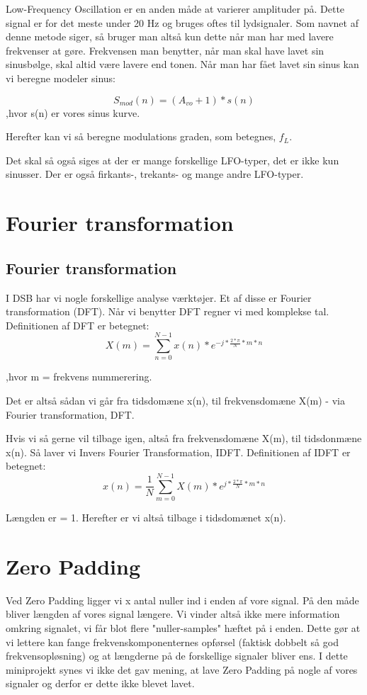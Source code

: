 \documentclass[12pt, letterpaper]{article}
\begin{document}
Low-Frequency Oscillation er en anden måde at varierer amplituder på. 
Dette signal er for det meste under 20 Hz og bruges oftes til lydsignaler. Som navnet af denne metode siger, så bruger man altså kun dette når man har med lavere frekvenser at gøre. Frekvensen man benytter, når man skal have lavet sin sinusbølge, skal altid være lavere end tonen. 
Når man har fået lavet sin sinus kan vi beregne modeler sinus: 

$$S_{mod} (n) = (A_{vo} + 1)*s(n)$$
,hvor s(n) er vores sinus kurve. 

Herefter kan vi så beregne modulations graden, som betegnes, $f_L$.

Det skal så også siges at der er mange forskellige LFO-typer, det er ikke kun sinusser. Der er også firkants-, trekants-  og mange andre LFO-typer. 


\section{Fourier transformation}

\subsection{Fourier transformation}


I DSB har vi nogle forskellige analyse værktøjer. Et af disse er Fourier transformation (DFT). Når vi benytter DFT regner vi med komplekse tal. 
Definitionen af DFT er betegnet: 
$$X(m)= \sum\limits_{n=0}^{N-1} x(n)*e^{-j*\frac{2*\pi}{N}*m*n}$$

,hvor m = frekvens nummerering. 


Det er altså sådan vi går fra tidsdomæne x(n), til frekvensdomæne X(m) - via Fourier transformation, DFT. 

Hvis vi så gerne vil tilbage igen, altså fra frekvensdomæne X(m), til tidsdonmæne x(n). Så laver vi Invers Fourier Transformation, IDFT. 
Definitionen af IDFT er betegnet: 
$$x(n)= \frac{1}{N} \sum\limits_{m=0}^{N-1} X(m)*e^{j*\frac{2*\pi}{N}*m*n}$$

Længden er = 1. 
Herefter er vi altså tilbage i tidsdomænet x(n).

\section{Zero Padding}
Ved Zero Padding ligger vi x antal nuller ind i enden af vore signal. På den måde bliver længden af vores signal længere. Vi vinder altså ikke mere information omkring signalet, vi får blot flere "nuller-samples" hæftet på i enden. 
Dette gør at vi lettere kan fange frekvenskomponenternes opførsel (faktisk dobbelt så god frekvensopløsning) og at længderne på de forskellige signaler bliver ens. 
I dette miniprojekt synes vi ikke det gav mening, at lave Zero Padding på nogle af vores signaler og derfor er dette ikke blevet lavet. 
\end{document}
